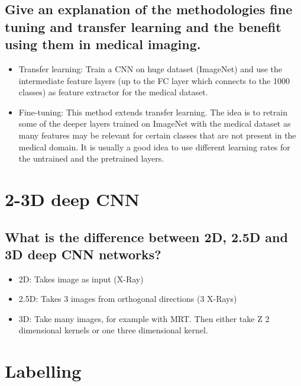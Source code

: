 \subsection{Give an explanation of the methodologies fine tuning and transfer learning and the benefit using them in medical imaging. }
\begin{itemize}
\item Transfer learning: Train a CNN on huge dataset (ImageNet) and use the intermediate feature layers (up to the FC layer which connects to the 1000 classes) as feature extractor for the medical dataset. 
\item Fine-tuning: This method extends transfer learning. The idea is to retrain some of the deeper layers trained on ImageNet with the medical dataset as many features may be relevant for certain classes that are not present in the medical domain. It is usually a good idea to use different learning rates for the untrained and the pretrained layers.
\end{itemize}

%
\section{2-3D deep CNN}
\subsection{What is the difference between 2D, 2.5D and 3D deep CNN networks?}
\begin{itemize}
\item 2D: Takes image as input (X-Ray)
\item 2.5D: Takes 3 images from orthogonal directions (3 X-Rays)
\item 3D: Take many images, for example with MRT. Then either take Z 2 dimensional kernels or one three dimensional kernel.
\end{itemize}

\section{Labelling}

